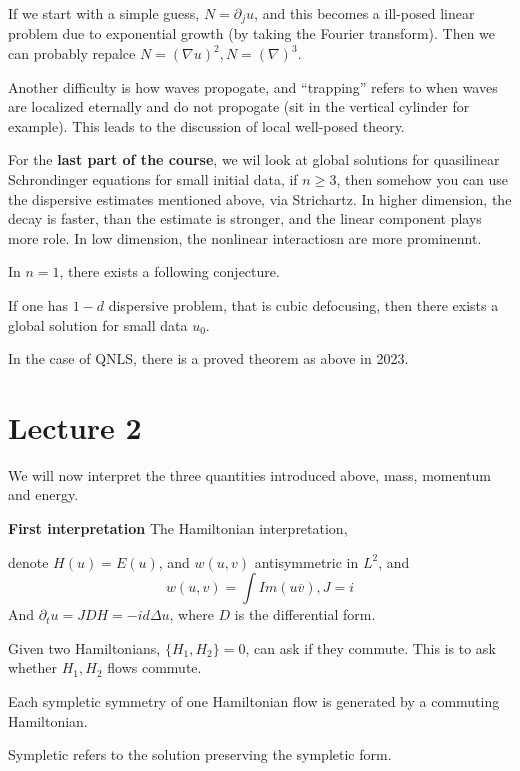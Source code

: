 If we start with a simple guess, $N=\partial_j u$, and this becomes a ill-posed linear problem due to exponential growth (by taking the Fourier transform). Then we can probably repalce $N=(\nabla u)^2, N=(\nabla)^3$.

Another difficulty is how waves propogate, and ``trapping'' refers to when waves are localized eternally and do not propogate (sit in the vertical cylinder for example). This leads to the discussion of local well-posed theory.

For the \textbf{last part of the course}, we wil look at global solutions for quasilinear Schrondinger equations for small initial data, if $n\geq 3$, then somehow you can use the dispersive estimates mentioned above, via Strichartz. In higher dimension, the decay is faster, than the estimate is stronger, and the linear component plays more role. In low dimension, the nonlinear interactiosn are more prominennt. 

In $n=1$, there exists a following conjecture.
\begin{proposition}[Conjecture]
    If one has $1-d$ dispersive problem, that is cubic defocusing, then there exists a global solution for small data $u_0$.
\end{proposition}
In the case of QNLS, there is a proved theorem as above in 2023.



\section{Lecture 2}

We will now interpret the three quantities introduced above, mass, momentum and energy.

\textbf{First interpretation}
The Hamiltonian interpretation,

denote $H(u)=E(u)$, and $w(u,v)$ antisymmetric in $L^2$, and 
\begin{equation*}
    w(u,v)=\int Im(u\overline{v}), J=i
\end{equation*}
And $\partial_tu=JDH=-id\Delta u$, where $D$ is the differential form.

Given two Hamiltonians, $\{H_1, H_2\}=0$, can ask if they commute. This is to ask whether $H_1, H_2$ flows commute.

\begin{theorem}[Noether]
    Each sympletic symmetry of one Hamiltonian flow is generated by a commuting Hamiltonian.
\end{theorem}
\begin{remark}
    Sympletic refers to the solution preserving the sympletic form.
\end{remark}

